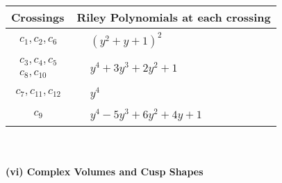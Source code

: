 \documentclass[1p]{elsarticle_modified}
\theoremstyle{definition}
\begin{document}
\begin{tabular}{m{50pt}|m{274pt}}
Crossings & \hspace{64pt}Riley Polynomials at each crossing \\
\hline $$\begin{aligned}c_{1},c_{2},c_{6}\end{aligned}$$&$\begin{aligned}
&(y^2+y+1)^2
\end{aligned}$\\
\hline $$\begin{aligned}c_{3},c_{4},c_{5}\\c_{8},c_{10}\end{aligned}$$&$\begin{aligned}
&y^4+3 y^3+2 y^2+1
\end{aligned}$\\
\hline $$\begin{aligned}c_{7},c_{11},c_{12}\end{aligned}$$&$\begin{aligned}
&y^4
\end{aligned}$\\
\hline $$\begin{aligned}c_{9}\end{aligned}$$&$\begin{aligned}
&y^4-5 y^3+6 y^2+4 y+1
\end{aligned}$\\
\hline
\end{tabular}\\~\\
\newpage\flushleft \textbf{(vi) Complex Volumes and Cusp Shapes}
\end{document}

